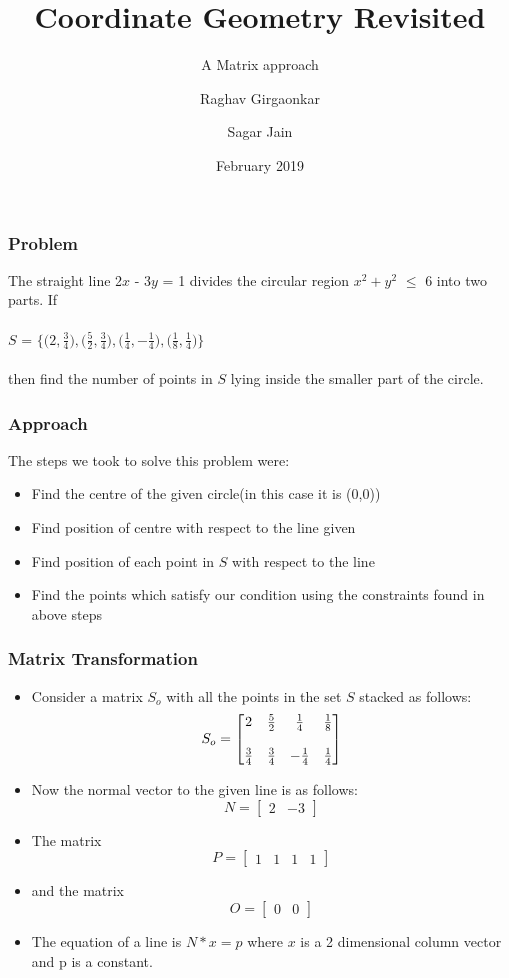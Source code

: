 \documentclass[xcolor=dvipsnames]{beamer}
\title{Coordinate Geometry Revisited}
\subtitle{A Matrix approach}
\author{Raghav Girgaonkar \and Sagar Jain}
\institute{Indian Institute of Technology Hyderabad}
\date{February 2019}
\begin{document}
 
\frame{\titlepage}
 
\begin{frame}
\frametitle{Problem}
The straight line 2$x$ - 3$y$ = 1 divides the circular region $x^{2} + y^{2}$ $\leqslant$ 6 into two parts. If\\~\\
$S$ = $\Bigg \lbrace \bigg(2,$\(\frac{3}{4}\)$\bigg),\bigg($\(\frac{5}{2}\)$,$\(\frac{3}{4}\)$\bigg),\bigg($\(\frac{1}{4}\)$,$\(-\frac{1}{4}\)$\bigg),\bigg($\(\frac{1}{8}\)$,$\(\frac{1}{4}\)$\bigg)\Bigg\rbrace$
\\~\\
then find the number of points in $S$ lying inside the smaller part of the circle.
\end{frame}

\begin{frame}
\frametitle{Approach}
The steps we took to solve this problem were:
\begin{itemize}
 \item<1-> Find the centre of the given circle(in this case it is (0,0))
 \item<2-> Find position of centre with respect to the line given
 \item<3-> Find position of each point in $S$ with respect to the line
 \item<4-> Find the points which satisfy our condition using the constraints found in above steps
\end{itemize}

\end{frame}

\begin{frame}
\frametitle{Matrix Transformation}
\begin{itemize}
\item<1-> Consider a matrix $S_o$ with all the points in the set $S$ stacked as follows: 
\[
 S_o =
\begin{bmatrix}
    2  & $\(\frac{5}{2}\)$ & $\(\frac{1}{4}\)$ & $\(\frac{1}{8}\)$ \\~\\
    $\(\frac{3}{4}\)$ & $\(\frac{3}{4}\)$ & $\(-\frac{1}{4}\)$ &$\(\frac{1}{4}\)$\\
    
\end{bmatrix}
\]
\item<2-> Now the normal vector to the given line is as follows:
\[
 N =
\begin{bmatrix}
    2  & -3
\end{bmatrix}
\]
\item<3-> The matrix
\[
 P =
\begin{bmatrix}
    1 & 1 & 1 & 1
\end{bmatrix}
\]

\item<4-> and the matrix
\[
 O =
\begin{bmatrix}
    0  & 0
\end{bmatrix}
\]
\item<5->The equation of a line is $N*x = p$ where $x$ is a 2 dimensional column vector and p is a constant.
\end{itemize}

\end{frame}
\end{document}
